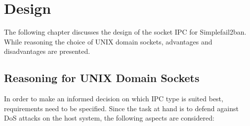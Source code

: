 %
%

\chapter{Design}
\label{cha:design}
The following chapter discusses the design of the socket \ac{IPC} for Simplefail2ban.
While reasoning the choice of UNIX domain sockets, advantages and disadvantages are presented.

\section{Reasoning for UNIX Domain Sockets}
\label{cha:ReasoningUNIXSockets}
In order to make an informed decision on which \ac{IPC} type is suited best, requirements need to be specified.
Since the task at hand is to defend against \ac{DoS} attacks on the host system, the following aspects are considered\cite{raatschen:ipc}:


